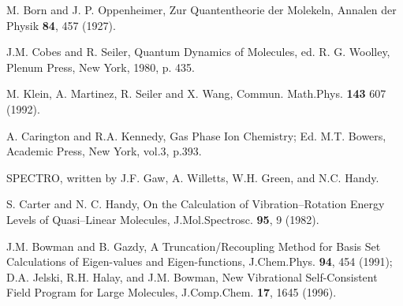 \begin{thebibliography}{999}


 M. Born and J. P. Oppenheimer, 
Zur Quantentheorie der Molekeln,
Annalen der Physik 
{\bf 84}, 457 (1927).

 J.M. Cobes and R. Seiler, Quantum Dynamics of Molecules,
ed. R. G.  Woolley, Plenum Press, New York, 1980, p. 435.

 M. Klein, A. Martinez, R. Seiler and X. Wang, Commun.
Math.Phys. {\bf 143}  607 (1992).

A. Carington and R.A. Kennedy, Gas Phase Ion Chemistry;
Ed. M.T. Bowers, Academic Press, New York, vol.3, p.393.


SPECTRO, written by J.F. Gaw, A. Willetts, W.H. Green, and N.C. Handy.

S. Carter and N. C. Handy, 
On the Calculation of Vibration--Rotation Energy Levels of
Quasi--Linear Molecules,
J.Mol.Spectrosc. {\bf 95}, 9 (1982).

J.M. Bowman and B. Gazdy, 
A Truncation/Recoupling Method for Basis Set Calculations of
Eigen-values and Eigen-functions,
J.Chem.Phys.
{\bf 94}, 454 (1991);
D.A. Jelski, R.H. Halay, and J.M. Bowman,
New Vibrational Self-Consistent Field Program
for Large Molecules,
J.Comp.Chem. {\bf 17}, 1645 (1996).














\end{thebibliography}
